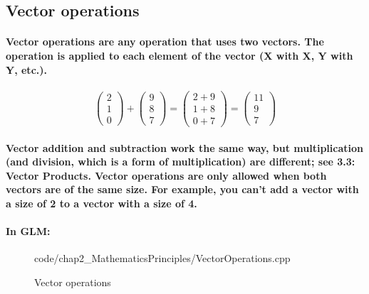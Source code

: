 \subsection{\textsf{Vector operations}}
\paragraph{
    Vector operations are any operation that uses two vectors. The operation is applied to each element of the vector (X with X, Y with Y, etc.).
}

\paragraph{
    \begin{equation*}
    \begin{pmatrix}
    2\\
    1\\
    0
    \end{pmatrix} +\begin{pmatrix}
    9\\
    8\\
    7
    \end{pmatrix} =\begin{pmatrix}
    2+9\\
    1+8\\
    0+7
    \end{pmatrix} =\begin{pmatrix}
    11\\
    9\\
    7
    \end{pmatrix}
    \end{equation*}
}

\paragraph{
    Vector addition and subtraction work the same way, but multiplication (and division, which is a form of multiplication) are different; see 3.3: Vector Products. Vector operations are only allowed when both vectors are of the same size. For example, you can't add a vector with a size of 2 to a vector with a size of 4.
}

\paragraph{
    In GLM:
}


\begin{frame}{}
    \begin{figure}[ht]
    \centering
    \colorbox{backgroundcolor}{
        \parbox{0.9\textwidth}{
            
            {code/chap2_MathematicsPrinciples/VectorOperations.cpp}
        }
    }
    \caption{Vector operations}
    \label{fig:vector_operations}
    \end{figure}
\end{frame}

